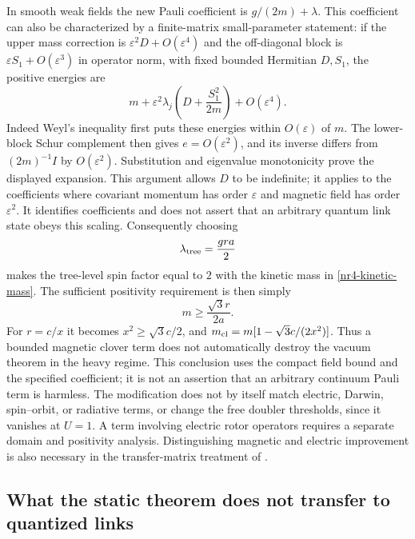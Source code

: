 In smooth weak fields the new Pauli coefficient is
$g/(2m)+\lambda$. This coefficient can also be characterized by a
finite-matrix small-parameter statement: if the upper mass correction
is $\varepsilon^2D+O(\varepsilon^4)$ and the off-diagonal block is
$\varepsilon S_1+O(\varepsilon^3)$ in operator norm, with fixed bounded
Hermitian $D,S_1$, the positive energies are
\[
 m+\varepsilon^2\lambda_j\left(D+\frac{S_1^2}{2m}\right)
       +O(\varepsilon^4).
\]
Indeed Weyl's inequality first puts these energies within $O(\varepsilon)$
of $m$. The lower-block Schur complement then gives $e=O(\varepsilon^2)$,
and its inverse differs from $(2m)^{-1}I$ by $O(\varepsilon^2)$.
Substitution and eigenvalue monotonicity prove the displayed expansion.
This argument allows $D$ to be indefinite; it applies to the coefficients
where covariant momentum has order $\varepsilon$ and magnetic field
has order $\varepsilon^2$. It identifies coefficients and does not assert
that an arbitrary quantum link state obeys this scaling.
Consequently choosing
\begin{equation}
 \lambda_{\rm tree}=\frac{gra}{2}
 \label{nr4-clover-tree}
\end{equation}
makes the tree-level spin factor equal to $2$ with the kinetic mass
in \eqref{nr4-kinetic-mass}. The sufficient positivity requirement is
then simply
\begin{equation}
 m\ge\frac{\sqrt3r}{2a}.
 \label{nr4-clover-tree-positive}
\end{equation}
For $r=c/x$ it becomes $x^2\ge\sqrt3c/2$, and
$m_{\rm cl}=m[1-\sqrt3c/(2x^2)]$.
Thus a bounded magnetic clover term does not automatically destroy the
vacuum theorem in the heavy regime. This conclusion uses the compact
field bound and the specified coefficient; it is not an assertion
that an arbitrary continuum Pauli term is harmless. The modification
does not by itself match electric, Darwin, spin--orbit, or radiative
terms, or change the free doubler thresholds, since it vanishes at
$U=1$. A term involving electric rotor operators requires a separate
domain and positivity analysis. Distinguishing magnetic and electric
improvement is also necessary in the transfer-matrix treatment of
\cite[Sec.~5.1]{EKM}.

\subsection{What the static theorem does not transfer to quantized links}
\label{nr4-remaining}

